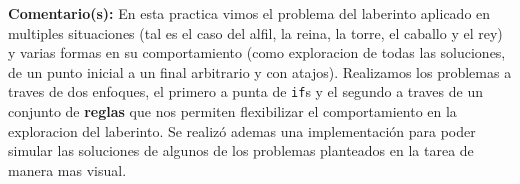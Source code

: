 \noindent\textbf{Comentario(s):} 
En esta practica vimos el problema del laberinto aplicado en multiples situaciones (tal es el caso del alfil, la reina, la torre, el caballo y el rey) y varias formas en su comportamiento (como exploracion de todas las soluciones, de un punto inicial a un final arbitrario y con atajos). Realizamos los problemas a traves de dos enfoques, el primero a punta de \texttt{if}s y el segundo a traves de un conjunto de \textbf{reglas} que nos permiten flexibilizar el comportamiento en la exploracion del laberinto. Se realizó ademas una implementación para poder simular las soluciones de algunos de los problemas planteados en la tarea de manera mas visual.

